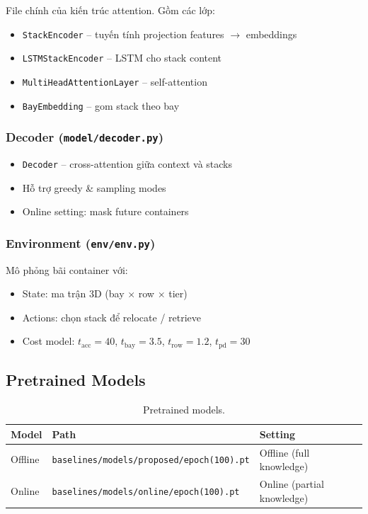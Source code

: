 \documentclass[11pt,a4paper]{article}
\theoremstyle{definition}
\begin{document}
File chính của kiến trúc attention. Gồm các lớp:
\begin{itemize}
    \item \texttt{StackEncoder} -- tuyến tính projection features $\to$ embeddings
    \item \texttt{LSTMStackEncoder} -- LSTM cho stack content
    \item \texttt{MultiHeadAttentionLayer} -- self-attention
    \item \texttt{BayEmbedding} -- gom stack theo bay
\end{itemize}

\subsubsection{Decoder (\texttt{model/decoder.py})}

\begin{itemize}
    \item \texttt{Decoder} -- cross-attention giữa context và stacks
    \item Hỗ trợ greedy \& sampling modes
    \item Online setting: mask future containers
\end{itemize}

\subsubsection{Environment (\texttt{env/env.py})}

Mô phỏng bãi container với:
\begin{itemize}
    \item State: ma trận 3D (bay $\times$ row $\times$ tier)
    \item Actions: chọn stack để relocate / retrieve
    \item Cost model: $t_{\text{acc}} = 40$, $t_{\text{bay}} = 3.5$, $t_{\text{row}} = 1.2$, $t_{\text{pd}} = 30$
\end{itemize}

\subsection{Pretrained Models}

\begin{table}[h!]
    \centering
    \begin{tabular}{lll}
        \toprule
        Model & Path & Setting \\
        \midrule
        Offline & \texttt{baselines/models/proposed/epoch(100).pt} & Offline (full knowledge) \\
        Online & \texttt{baselines/models/online/epoch(100).pt} & Online (partial knowledge) \\
        \bottomrule
    \end{tabular}
    \caption{Pretrained models.}
    \label{tab:models}
\end{table}
\end{document}
